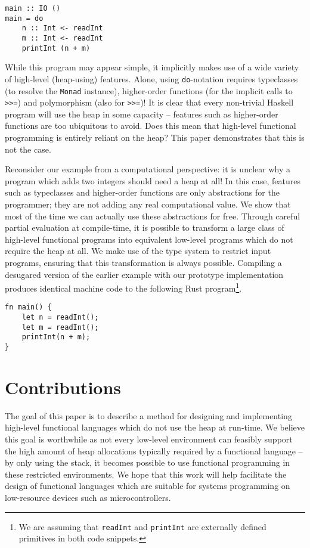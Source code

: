 \documentclass[runningheads]{llncs}
\begin{document}
\begin{verbatim}
main :: IO ()
main = do
    n :: Int <- readInt
    m :: Int <- readInt
    printInt (n + m)
\end{verbatim}

While this program may appear simple, it implicitly makes use of a wide variety of high-level (heap-using) features. Alone, using \texttt{do}-notation requires typeclasses (to resolve the \texttt{Monad} instance), higher-order functions (for the implicit calls to \texttt{>>=}) and polymorphism (also for \texttt{>>=})! It is clear that every non-trivial Haskell program will use the heap in some capacity -- features such as higher-order functions are too ubiquitous to avoid. Does this mean that high-level functional programming is entirely reliant on the heap? This paper demonstrates that this is not the case.

Reconsider our example from a computational perspective: it is unclear why a program which adds two integers should need a heap at all! In this case, features such as typeclasses and higher-order functions are only abstractions for the programmer; they are not adding any real computational value. We show that most of the time we can actually use these abstractions for free. Through careful partial evaluation at compile-time, it is possible to transform a large class of high-level functional programs into equivalent low-level programs which do not require the heap at all. We make use of the type system to restrict input programs, ensuring that this transformation is always possible. Compiling a desugared version of the earlier example with our prototype implementation produces identical machine code to the following Rust program\footnote{We are assuming that \texttt{readInt} and \texttt{printInt} are externally defined primitives in both code snippets.}.

\begin{verbatim}
fn main() {
    let n = readInt();
    let m = readInt();
    printInt(n + m);
}
\end{verbatim}

\section{Contributions}

The goal of this paper is to describe a method for designing and implementing high-level functional languages which do not use the heap at run-time. We believe this goal is worthwhile as not every low-level environment can feasibly support the high amount of heap allocations typically required by a functional language -- by only using the stack, it becomes possible to use functional programming in these restricted environments. We hope that this work will help facilitate the design of functional languages which are suitable for systems programming on low-resource devices such as microcontrollers.
\end{document}
